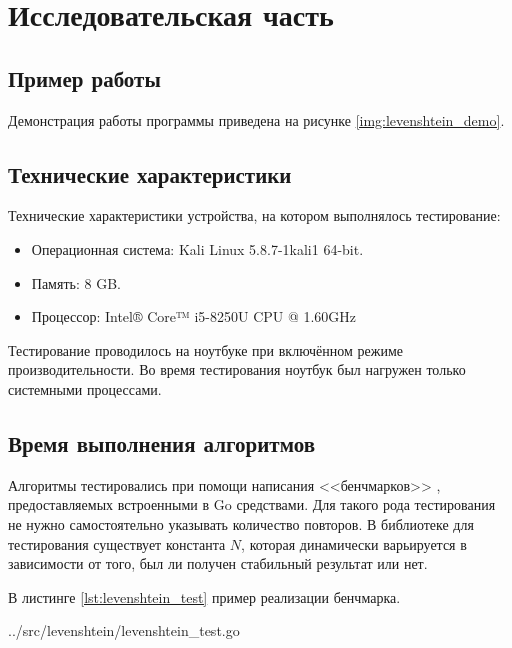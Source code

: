 \chapter{Исследовательская часть}

\section{Пример работы}

Демонстрация работы программы приведена на рисунке \ref{img:levenshtein_demo}.


\section{Технические характеристики}

Технические характеристики устройства, на котором выполнялось тестирование:

\begin{itemize}
	\item Операционная система: Kali \cite{kali} Linux \cite{linux} 5.8.7-1kali1 64-bit.
	\item Память: 8 GB.
	\item Процессор: Intel® Core™ i5-8250U \cite{intel} CPU @ 1.60GHz
\end{itemize}

Тестирование проводилось на ноутбуке при включённом режиме производительности. Во время тестирования ноутбук был нагружен только системными процессами.

\section{Время выполнения алгоритмов}

Алгоритмы тестировались при помощи написания <<бенчмарков>> \cite{gotest}, предоставляемых встроенными в Go средствами. Для такого рода тестирования не нужно самостоятельно указывать количество повторов. В библиотеке для тестирования существует константа $N$, которая динамически варьируется в зависимости от того, был ли получен стабильный результат или нет.

В листинге \ref{lst:levenshtein_test} пример реализации бенчмарка.

\begin{lstinputlisting}[
	caption={Реализация бенчмарка},
	label={lst:levenshtein_test},
	style={go},
	linerange={1-17},
	]{../src/levenshtein/levenshtein_test.go}
\end{lstinputlisting}

